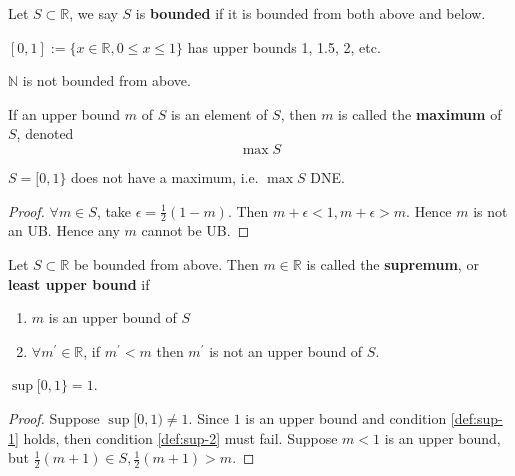 \begin{definition}[Bounded]
    Let $S \subset \mathbb{R}$, we say $S$ is \textbf{bounded} 
    if it is bounded from both above and below.
\end{definition}


\begin{example}
    $[0, 1]:= \{ x \in \mathbb{R}, 0 \leq x \leq 1 \} $  has upper bounds 1, 1.5, 2, etc.
\end{example}

\begin{example}
    $\mathbb{N}$ is not bounded from above.
\end{example}

\begin{definition}[Maximum]
    If an upper bound $m$ of $S$ is an element of $S$, then $m$ is called the \textbf{maximum} of $S$, denoted 
    \[
        \max S
    \]
\end{definition}

\begin{example}
    $S = [ 0, 1 \} $ does not have a maximum, i.e. $\max S$ DNE.
\end{example}
\begin{proof}
    $\forall m \in S$, take $\epsilon = \frac{1}{2} (1 - m)$. Then $m + \epsilon < 1, m + \epsilon > m$. Hence $m$ is not an UB. Hence any $m$ cannot be UB.
\end{proof}

\begin{definition}
    Let $S \subset \mathbb{R}$ be bounded from above. Then $m \in \mathbb{R}$ is called the \textbf{supremum}, or \textbf{least upper bound} if 
    \begin{enumerate}
        \item \label{def:sup-1} $m$ is an upper bound of $S$ 
        \item \label{def:sup-2} $\forall m^{\prime} \in \mathbb{R}$, if $m^{\prime} < m$ then $m^{\prime}$ is not an upper bound of $S$.
    \end{enumerate} 
\end{definition}

\begin{remark}
    $\sup [0, 1\} = 1$. 
\end{remark}

\begin{proof}
    Suppose $\sup [0, 1) \neq 1$. 
    Since $1$ is an upper bound and condition \ref{def:sup-1} holds, 
    then condition \ref{def:sup-2} must fail. 
    Suppose $m < 1$ is an upper bound, 
    but $ \frac{1}{2}(m + 1) \in S, \frac{1}{2}(m +1) > m$.
\end{proof}

